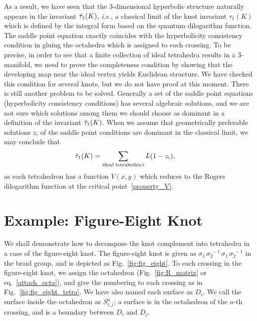 \documentclass[12pt]{article}
\numberwithin{equation}{section}
\renewcommand{\Im}{\text{Im}}
\begin{document}
As a result,
we have seen that
the 3-dimensional hyperbolic structure naturally appears in
the invariant $\Tilde{\tau}_1(K)$, \emph{i.e.},
a classical limit of
the knot invariant $\tau_1(K)$  which is defined
by the integral form based on the quantum dilogarithm function.
The saddle point equation  exactly coincides
with the hyperbolicity consistency  condition in  gluing the octahedra which is
assigned to each crossing.
To be precise,
in order to see that
a finite collection of ideal tetrahedra results in  a 3-manifold,
we need to  prove  the completeness condition
by showing that
the  developing map near the ideal vertex yields Euclidean structure.
We have  checked this condition for several knots,
but  we do not
have proof at this moment.
There is still another problem to be solved.
Generally a set of the saddle point equations (hyperbolicity
consistency conditions)  has several algebraic solutions, and
we are not sure which solutions
among   them
we should choose  as 
dominant  in a definition of the invariant $\Tilde{\tau}_1(K)$.
When we assume that  
geometrically preferable   solutions $z_i$ of the saddle point
conditions
are
dominant
in  the  classical limit,
we may  conclude that
\begin{align}
  \label{result_tau}
  \Tilde{\tau}_1(K)
  & =
  \sum_{\text{ideal tetrahedra}:  i}
  L(1-z_i) ,
%
\end{align}
as each tetrahedron has a function $V(x,y)$
which reduces to the Rogers dilogarithm
function   at the critical point~\eqref{property_V}.






\section{Example: Figure-Eight Knot}
\label{sec:eight}

We shall demonstrate
how to decompose the knot complement  into  tetrahedra in a
case of the  figure-eight knot.
The figure-eight knot is
given as $\sigma_1 \, \sigma_2^{~-1} \, \sigma_1
\, \sigma_2^{~-1}$ in the braid group, and is
depicted as Fig.~\ref{fig:fig_eight}.
To each crossing in the  figure-eight knot,  we assign the octahedron
(Fig.~\ref{fig:R_matrix}
or eq.~\eqref{attach_octa}),
and
give the numbering to each crossing  as in
Fig.~\ref{fig:fig_eight_tetra}.
We have  also named  each surface as  $D_i$.
We call the surface inside the octahedron as $S^a_{i,j}$;
a  surface  is  in  the octahedron of the $a$-th crossing,
and is a boundary
between $D_i$ and $D_j$.
\end{document}

